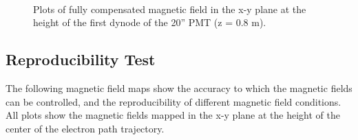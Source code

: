 %
%
\begin{figure}[hp]
  \begin{center}
    \\
    \vspace{-3 mm}
  \caption{Plots of fully compensated magnetic field in the x-y plane at the height of the first dynode of the 20'' PMT (z = 0.8 m).}
  \label{fig:bfield_fullcomp800}
  \end{center}
\end{figure}
%

\newpage
\subsection{Reproducibility Test}
\label{Appendix:ReproducibilityTest}

The following magnetic field maps show the accuracy to which the magnetic fields can be controlled, and the reproducibility of different magnetic field conditions.
All plots show the magnetic fields mapped in the x-y plane at the height of the center of the electron path trajectory.

